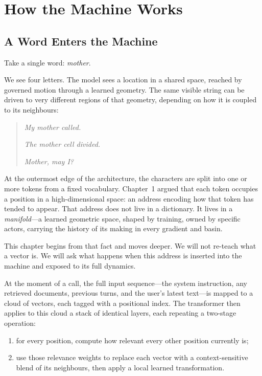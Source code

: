 
\chapter{How the Machine Works}
\thispagestyle{plain}

\bigskip

\section{A Word Enters the Machine}

Take a single word: \emph{mother}.

We see four letters. The model sees a location in a shared space, reached by governed motion through a learned geometry. The same visible string can be driven to very different regions of that geometry, depending on how it is coupled to its neighbours:

\begin{quote}
\emph{My mother called.}

\emph{The mother cell divided.}

\emph{Mother, may I?}
\end{quote}

At the outermost edge of the architecture, the characters are split into one or more tokens from a fixed vocabulary. Chapter~1 argued that each token occupies a position in a high-dimensional space: an address encoding how that token has tended to appear. That address does not live in a dictionary. It lives in a \emph{manifold}---a learned geometric space, shaped by training, owned by specific actors, carrying the history of its making in every gradient and basin.

This chapter begins from that fact and moves deeper. We will not re-teach what a vector is. We will ask what happens when this address is inserted into the machine and exposed to its full dynamics.

At the moment of a call, the full input sequence---the system instruction, any retrieved documents, previous turns, and the user's latest text---is mapped to a cloud of vectors, each tagged with a positional index. The transformer then applies to this cloud a stack of identical layers, each repeating a two-stage operation:

\begin{enumerate}
  \item for every position, compute how relevant every other position currently is;
  \item use those relevance weights to replace each vector with a context-sensitive blend of its neighbours, then apply a local learned transformation.
\end{enumerate}

